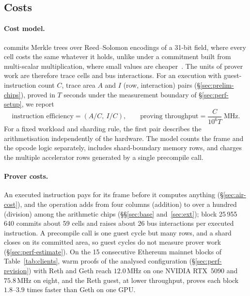 \subsection{Costs}
\label{sec:intro-costs}

\paragraph{Cost model.} \Ziren{} commits Merkle trees over Reed--Solomon encodings of a 31-bit field, where every cell costs the same whatever it holds, unlike under a commitment built from multi-scalar multiplication, where small values are cheaper~\citep{jolt}. The units of prover work are therefore trace cells and bus interactions. For an execution with guest-instruction count $C$, trace area $A$ and $I$ (row, interaction) pairs (\S\ref{sec:prelim-chips}), proved in $T$ seconds under the measurement boundary of \S\ref{sec:perf-setup}, we report
\[
  \text{instruction efficiency} = (A/C,\ I/C),
  \qquad
  \text{proving throughput} = \frac{C}{10^6 T}\;\mathrm{MHz}.
\]
For a fixed workload and sharding rule, the first pair describes the arithmetisation independently of the hardware. The model counts the frame and the opcode logic separately, includes shard-boundary memory rows, and charges the multiple accelerator rows generated by a single precompile call.

\paragraph{Prover costs.} An executed instruction pays for its frame before it computes anything (\S\ref{sec:air-cost}), and the operation adds from four columns (addition) to over a hundred (division) among the arithmetic chips (\S\S\ref{sec:base} and~\ref{sec:ext}); block 25\,955\,640 commits about 59 cells and raises about 26 bus interactions per executed instruction. A precompile call is one guest cycle but many rows, and a shard closes on its committed area, so guest cycles do not measure prover work (\S\ref{sec:perf-estimate}). On the 15 consecutive Ethereum mainnet blocks of Table~\ref{tab:clients}, warm proofs of the analysed configuration (\S\ref{sec:perf-revision}) with Reth and Geth reach $12.0$\,MHz on one NVIDIA RTX~5090 and $75.8$\,MHz on eight, and the Reth guest, at lower throughput, proves each block $1.8$--$3.9$ times faster than Geth on one GPU.

